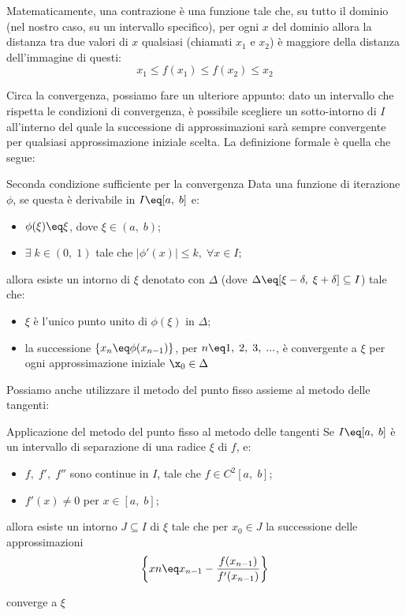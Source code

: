 Matematicamente, una contrazione è una funzione tale che, su tutto il dominio (nel nostro caso, su un intervallo specifico), per ogni $x$ del dominio allora la distanza tra due valori di $x$ qualsiasi (chiamati $x_1$ e $x_2$) è maggiore della distanza dell'immagine di questi:
\[ x_1 \leq f(x_1) \leq f(x_2) \leq x_2 \]

Circa la convergenza, possiamo fare un ulteriore appunto: dato un intervallo che rispetta le condizioni di convergenza, è possibile scegliere un sotto-intorno di $I$ all'interno del quale la successione di approssimazioni sarà sempre convergente per qualsiasi approssimazione iniziale scelta. La definizione formale è quella che segue:

\begin{theorem}{Seconda condizione sufficiente per la convergenza}
    Data una funzione di iterazione $\phi$, se questa è derivabile in $I \eq [a, \; b]$ e:
    \begin{itemize}
        \item $\phi(\xi) \eq \xi$, dove $\xi \in (a, \; b)$;
        \item $\exists \; k \in (0, \; 1)$ tale che $|\phi'(x)| \leq k, \; \forall x \in I$;
    \end{itemize}

    allora esiste un intorno di $\xi$ denotato con $\Delta$ (dove $\Delta \eq [\xi - \delta, \; \xi + \delta] \subseteq I$) tale che:
    \begin{itemize}
        \item $\xi$ è l'unico punto unito di $\phi(\xi)$ in $\Delta$;
        \item la successione $\{ x_n \eq \phi(x_{n - 1}) \}$, per $n \eq 1, \; 2, \; 3, \; ...$, è convergente a $\xi$ per ogni approssimazione iniziale $\x_0 \in \Delta$
    \end{itemize}
\end{theorem}

Possiamo anche utilizzare il metodo del punto fisso assieme al metodo delle tangenti:

\begin{theorem}{Applicazione del metodo del punto fisso al metodo delle tangenti}
    Se $I \eq [a, \; b]$ è un intervallo di separazione di una radice $\xi$ di $f$, e:
    \begin{itemize}
        \item $f, \; f', \; f''$ sono continue in $I$, tale che $f \in C^2 [a, \; b]$;
        \item $f'(x) \neq 0$ per $x \in [a, \; b]$;
    \end{itemize}

    allora esiste un intorno $J \subseteq I$ di $\xi$ tale che per $x_0 \in J$ la successione delle approssimazioni
    \[ \left\{ xn \eq x_{n - 1} - \frac{f(x_{n - 1})}{f'(x_{n - 1})} \right\} \]

    converge a $\xi$
\end{theorem}

